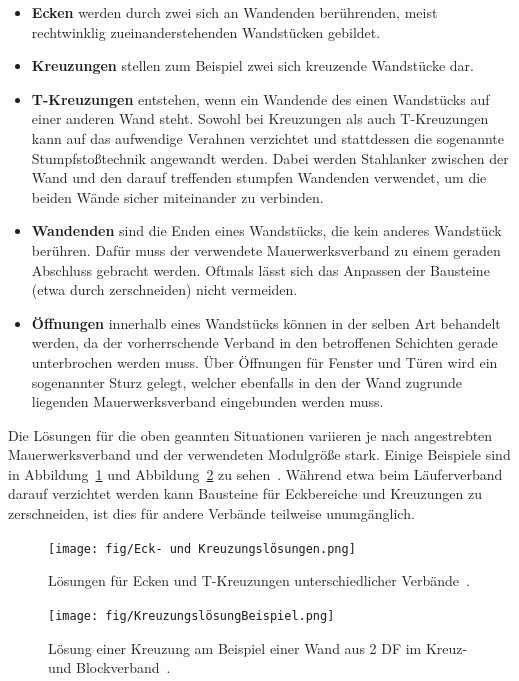 \begin{itemize}
  \item \textbf{Ecken} werden durch zwei sich an Wandenden berührenden, meist rechtwinklig zueinanderstehenden Wandstücken gebildet.
  \item \textbf{Kreuzungen} stellen zum Beispiel zwei sich kreuzende Wandstücke dar.
  \item \textbf{T-Kreuzungen} entstehen, wenn ein Wandende des einen Wandstücks auf einer anderen Wand steht.
  Sowohl bei Kreuzungen als auch T-Kreuzungen kann auf das aufwendige Verahnen verzichtet und stattdessen die sogenannte Stumpfstoßtechnik angewandt werden.
  Dabei werden Stahlanker zwischen der Wand und den darauf treffenden \glqq{}stumpfen\grqq{} Wandenden verwendet, um die beiden Wände sicher miteinander zu verbinden.
  \item \textbf{Wandenden} sind die \glqq{}Enden\grqq{} eines Wandstücks, die kein anderes Wandstück berühren.
  Dafür muss der verwendete Mauerwerksverband zu einem geraden Abschluss gebracht werden.
  Oftmals lässt sich das Anpassen der Bausteine (etwa durch zerschneiden) nicht vermeiden.
  \item \textbf{Öffnungen} innerhalb eines Wandstücks können in der selben Art behandelt werden, da der vorherrschende Verband in den betroffenen Schichten gerade unterbrochen werden muss.
  Über Öffnungen für Fenster und Türen wird ein sogenannter Sturz gelegt, welcher ebenfalls in den der Wand zugrunde liegenden Mauerwerksverband eingebunden werden muss.  
\end{itemize}
Die Lösungen für die oben geannten Situationen variieren je nach angestrebten Mauerwerksverband und der verwendeten Modulgröße stark.
Einige Beispiele sind in Abbildung~\ref{fig:basics:mauerwerk_eckloesung} und Abbildung~\ref{fig:basics:Kreuzungsloesung} zu sehen~\cite{Moro2021}\cite{MaurerfibelKreuzungen:online}.
Während etwa beim Läuferverband darauf verzichtet werden kann Bausteine für Eckbereiche und Kreuzungen zu zerschneiden, ist dies für andere Verbände teilweise unumgänglich. 

\begin{figure}[h]
  \centering
  \texttt{[image: fig/Eck- und Kreuzungslösungen.png]}
  \caption{Lösungen für Ecken und T-Kreuzungen unterschiedlicher Verbände~\cite{Moro2021}.}\label{fig:basics:mauerwerk_eckloesung}
\end{figure}

\begin{figure}[h]
  \centering
  \texttt{[image: fig/KreuzungslösungBeispiel.png]}
  \caption{Lösung einer Kreuzung am Beispiel einer \glqq{}Wand aus 2 DF im Kreuz- und Blockverband\grqq{}~\cite{MaurerfibelKreuzungen:online}.}\label{fig:basics:Kreuzungsloesung}
\end{figure}

